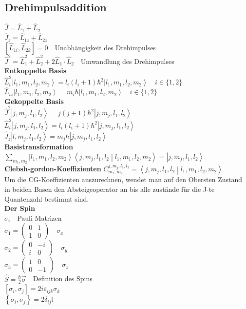 \documentclass[8pt,a4paper]{extarticle}
\newcommand{\frml}[2]{$#1$~\hfill~#2\\}
\newcommand{\komut}[2]{\left[#1,#2 \right]}
\newcommand{\ket}[1]{\left|#1\right\rangle}
\newcommand{\oper}[1]{\hat#1}
\newcommand{\braket}[2]                               %
{\left\langle#1 \middle| #2\right\rangle}
\begin{document}
\begin{multicols}{3}
\subsection{Drehimpulsaddition}
\frml{\oper{J}=\oper{L}_1+\oper{L}_2}{}
\frml{\oper{J}_z = \oper{L}_{1z} +\oper{L}_{2z}}{}
\frml{\komut{\oper{L}_{1i}}{\oper{L}_{2k}} = 0}{Unabh\"angigkeit des Drehimpulses}
\frml{\oper{J}^2 = \oper{L}_1^2 + \oper{L}_2^2+2\oper{L}_1\cdot \oper{L}_2}{Umwandlung des Drehimpulses}
\textbf{Entkoppelte Basis}\\
\frml{\oper{L}_i^2\ket{l_1,m_1,l_2,m_2} = l_i(l_i+1)\hbar^2\ket{l_1,m_1,l_2,m_2}}{$i\in\{1,2\}$}
\frml{\oper{L}_{iz}\ket{l_1,m_1,l_2,m_2} = m_i\hbar\ket{l_1,m_1,l_2,m_2}}{$i\in\{1,2\}$}
\textbf{Gekoppelte Basis}\\
\frml{\oper{J}^2\ket{j,m_j,l_1,l_2} = j(j+1)\hbar^2\ket{j,m_j,l_1,l_2}}{}
\frml{\oper{L}_i^2\ket{j,m_j,l_1,l_2} = l_i(l_i+1)\hbar^2\ket{j,m_j,l_1,l_2}}{}
\frml{\oper{J}_z\ket{l,m_j,l_1,l_2} = m_j\hbar\ket{j,m_j,l_1,l_2}}{}
\textbf{Basistransformation}\\
\frml{\sum_{m_1,m_2}\ket{l_1,m_1,l_2,m_2}\braket{j,m_j,l_1,l_2}{l_1,m_1,l_2,m_2} = \ket{j,m_j,l_1,l_2}}{}
\textbf{Clebsh-gordon-Koeffizienten}
\frml{C_{m_1,m_2}^{j,m_j,l_1,l_2} = \braket{j,m_j,l_1,l_2}{l_1,m_1,l_2,m_2}}{}
Um die CG-Koeffizienten auszurechnen, wendet man auf den Obersten Zustand in beiden Basen den Absteigeoperator an
bis alle zust\"ande f\"ur die J-te Quantenzahl bestimmt sind.\\
\textbf{Der Spin}\\
\frml{\sigma_i}{Pauli Matrizen}
\frml{\sigma_1 = \begin{pmatrix} 0 & 1 \\ 1 & 0 \end{pmatrix}}{$\sigma_x$}
\frml{\sigma_2 = \begin{pmatrix} 0 & -i \\ i & 0 \end{pmatrix}}{$\sigma_y$}
\frml{\sigma_3 = \begin{pmatrix} 1 & 0 \\ 0 & -1 \end{pmatrix}}{$\sigma_z$}
\frml{\oper{S} = \frac{\hbar}{2}\vec{\sigma}}{Definition des Spins}
\frml{\left[\sigma_i,\sigma_j\right] = 2i \varepsilon_{ijk}\sigma_k}{}
\frml{\left\{\sigma_i,\sigma_j\right\} = 2\delta_{ij} \mathbb{I}}{}

\end{multicols}
\end{document}
